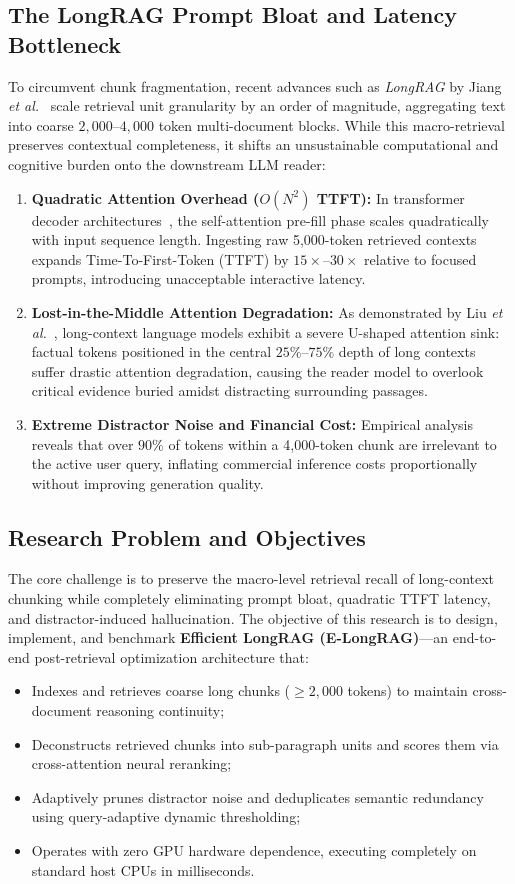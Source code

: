 \documentclass[lettersize,journal]{IEEEtran}
\begin{document}
\subsection{The LongRAG Prompt Bloat and Latency Bottleneck}
To circumvent chunk fragmentation, recent advances such as \textit{LongRAG} by Jiang \textit{et al.}~\cite{longrag} scale retrieval unit granularity by an order of magnitude, aggregating text into coarse $2,000$--$4,000$ token multi-document blocks. While this macro-retrieval preserves contextual completeness, it shifts an unsustainable computational and cognitive burden onto the downstream LLM reader:
\begin{enumerate}
    \item \textbf{Quadratic Attention Overhead ($O(N^2)$ TTFT):} In transformer decoder architectures~\cite{attention}, the self-attention pre-fill phase scales quadratically with input sequence length. Ingesting raw 5,000-token retrieved contexts expands Time-To-First-Token (TTFT) by $15\times$--$30\times$ relative to focused prompts, introducing unacceptable interactive latency.
    \item \textbf{Lost-in-the-Middle Attention Degradation:} As demonstrated by Liu \textit{et al.}~\cite{lostinmiddle}, long-context language models exhibit a severe U-shaped attention sink: factual tokens positioned in the central $25\%$--$75\%$ depth of long contexts suffer drastic attention degradation, causing the reader model to overlook critical evidence buried amidst distracting surrounding passages.
    \item \textbf{Extreme Distractor Noise and Financial Cost:} Empirical analysis reveals that over $90\%$ of tokens within a 4,000-token chunk are irrelevant to the active user query, inflating commercial inference costs proportionally without improving generation quality.
\end{enumerate}

\IEEEpubidadjcol

\subsection{Research Problem and Objectives}
The core challenge is to preserve the macro-level retrieval recall of long-context chunking while completely eliminating prompt bloat, quadratic TTFT latency, and distractor-induced hallucination. The objective of this research is to design, implement, and benchmark \textbf{Efficient LongRAG (E-LongRAG)}---an end-to-end post-retrieval optimization architecture that:
\begin{itemize}
    \item Indexes and retrieves coarse long chunks ($\ge 2,000$ tokens) to maintain cross-document reasoning continuity;
    \item Deconstructs retrieved chunks into sub-paragraph units and scores them via cross-attention neural reranking;
    \item Adaptively prunes distractor noise and deduplicates semantic redundancy using query-adaptive dynamic thresholding;
    \item Operates with zero GPU hardware dependence, executing completely on standard host CPUs in milliseconds.
\end{itemize}
\end{document}
